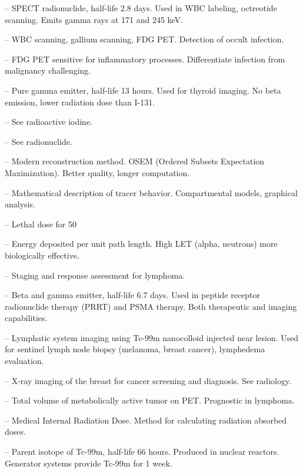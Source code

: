 -- SPECT radionuclide, half-life 2.8 days. Used in WBC labeling, octreotide scanning. Emits gamma rays at 171 and 245 keV.

-- WBC scanning, gallium scanning, FDG PET. Detection of occult infection.

-- FDG PET sensitive for inflammatory processes. Differentiate infection from malignancy challenging.

-- Pure gamma emitter, half-life 13 hours. Used for thyroid imaging. No beta emission, lower radiation dose than I-131.

-- See radioactive iodine.

-- See radionuclide.

-- Modern reconstruction method. OSEM (Ordered Subsets Expectation Maximization). Better quality, longer computation.

-- Mathematical description of tracer behavior. Compartmental models, graphical analysis.

-- Lethal dose for 50%

-- Energy deposited per unit path length. High LET (alpha, neutrons) more biologically effective.

-- Staging and response assessment for lymphoma.

-- Beta and gamma emitter, half-life 6.7 days. Used in peptide receptor radionuclide therapy (PRRT) and PSMA therapy. Both therapeutic and imaging capabilities.

-- Lymphatic system imaging using Tc-99m nanocolloid injected near lesion. Used for sentinel lymph node biopsy (melanoma, breast cancer), lymphedema evaluation.

-- X-ray imaging of the breast for cancer screening and diagnosis. See radiology.

-- Total volume of metabolically active tumor on PET. Prognostic in lymphoma.

-- Medical Internal Radiation Dose. Method for calculating radiation absorbed doses.

-- Parent isotope of Tc-99m, half-life 66 hours. Produced in nuclear reactors. Generator systems provide Tc-99m for 1 week.

